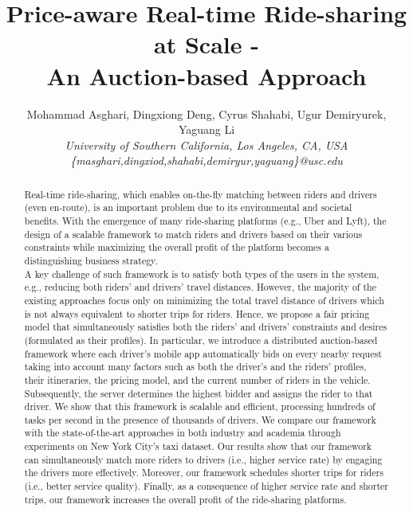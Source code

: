 \documentclass[letterpaper]{sig-alternate-05-2015}
\title{Price-aware Real-time Ride-sharing at Scale -\\An Auction-based Approach}
\author{{Mohammad Asghari, Dingxiong Deng, Cyrus Shahabi, Ugur Demiryurek, Yaguang Li}\\
\fontsize{10}{10}\selectfont\rmfamily\itshape
University of Southern California, Los Angeles, CA, USA\\
\fontsize{9}{9}\selectfont\ttfamily\upshape
\{masghari,dingxiod,shahabi,demiryur,yaguang\}@usc.edu\\
}
\begin{document}

\maketitle

\begin{abstract}
Real-time ride-sharing, which enables on-the-fly matching between riders and drivers (even en-route), is an important problem due to its environmental and societal benefits. With the emergence of many ride-sharing platforms (e.g., Uber and Lyft), the design of a scalable framework to match riders and drivers based on their various constraints while maximizing the overall profit of the platform becomes a distinguishing business strategy.\\
A key challenge of such framework is to satisfy both types of the users in the system, e.g., reducing both riders' and drivers' travel distances. However, the majority of the existing approaches focus only on minimizing the total travel distance of drivers which is not always equivalent to shorter trips for riders. Hence, we propose a fair pricing model that simultaneously satisfies both the riders' and drivers' constraints and desires (formulated as their profiles). In particular, we introduce a distributed auction-based framework where each driver's mobile app automatically bids on every nearby request taking into account many factors such as both the driver's and the riders' profiles, their itineraries, the pricing model, and the current number of riders in the vehicle.  Subsequently, the server determines the highest bidder and assigns the rider to that driver. We show that this framework is scalable and efficient, processing hundreds of tasks per second in the presence of thousands of drivers. We compare our framework with the state-of-the-art approaches in both industry and academia through experiments on New York City's taxi dataset.  Our results show that our framework can simultaneously match more riders to drivers (i.e., higher service rate) by engaging the drivers more effectively. Moreover, our framework schedules shorter trips for riders (i.e., better service quality). Finally, as a consequence of higher service rate and shorter trips, our framework increases the overall profit of the ride-sharing platforms.
\end{abstract}
\end{document}
